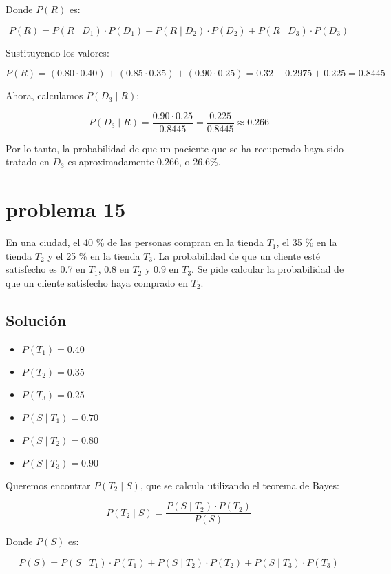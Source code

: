 \documentclass[12pt,a4paper]{article}
\begin{document}
Donde \( P(R) \) es:

\[
P(R) = P(R \mid D_1) \cdot P(D_1) + P(R \mid D_2) \cdot P(D_2) + P(R \mid D_3) \cdot P(D_3)
\]

Sustituyendo los valores:

\[
P(R) = (0.80 \cdot 0.40) + (0.85 \cdot 0.35) + (0.90 \cdot 0.25) = 0.32 + 0.2975 + 0.225 = 0.8445
\]

Ahora, calculamos \( P(D_3 \mid R) \):

\[
P(D_3 \mid R) = \frac{0.90 \cdot 0.25}{0.8445} = \frac{0.225}{0.8445} \approx 0.266
\]

Por lo tanto, la probabilidad de que un paciente que se ha recuperado haya sido tratado en \( D_3 \) es aproximadamente \( 0.266 \), o 26.6\%.

\newpage 
\section*{problema 15}
En una ciudad, el 40 \% de las personas compran en la tienda \( T_1 \), el 35 \% en la tienda \( T_2 \) y el 25 \% en la tienda \( T_3 \). La probabilidad de que un cliente esté satisfecho es 0.7 en \( T_1 \), 0.8 en \( T_2 \) y 0.9 en \( T_3 \). Se pide calcular la probabilidad de que un cliente satisfecho haya comprado en \( T_2 \).

\subsection*{Solución}

\begin{itemize}
    \item \( P(T_1) = 0.40 \)
    \item \( P(T_2) = 0.35 \)
    \item \( P(T_3) = 0.25 \)
    \item \( P(S \mid T_1) = 0.70 \)
    \item \( P(S \mid T_2) = 0.80 \)
    \item \( P(S \mid T_3) = 0.90 \)
\end{itemize}

Queremos encontrar \( P(T_2 \mid S) \), que se calcula utilizando el teorema de Bayes:

\[
P(T_2 \mid S) = \frac{P(S \mid T_2) \cdot P(T_2)}{P(S)}
\]

Donde \( P(S) \) es:

\[
P(S) = P(S \mid T_1) \cdot P(T_1) + P(S \mid T_2) \cdot P(T_2) + P(S \mid T_3) \cdot P(T_3)
\]
\end{document}
